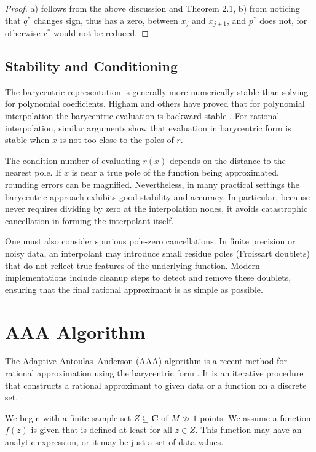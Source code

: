 \documentclass[11pt]{article}
\theoremstyle{definition}
\begin{document}
\begin{proof}
    a) follows from the above discussion and Theorem 2.1, b) from noticing that $q^{*}$ changes sign, thus has a zero, between $x_{j}$ and $x_{j+1}$, and $p^{*}$ does not, for otherwise $r^{*}$ would not be reduced.
\end{proof}

\subsection*{Stability and Conditioning}
The barycentric representation  is generally more numerically stable than solving for polynomial coefficients.  Higham and others have proved that for polynomial interpolation the barycentric evaluation is backward stable \cite{berrut2005barycentric}.  For rational interpolation, similar arguments show that evaluation in barycentric form is stable when $x$ is not too close to the poles of $r$.

The condition number of evaluating $r(x)$ depends on the distance to the nearest pole.  If $x$ is near a true pole of the function being approximated, rounding errors can be magnified.  Nevertheless, in many practical settings the barycentric approach exhibits good stability and accuracy.  In particular, because  never requires dividing by zero at the interpolation nodes, it avoids catastrophic cancellation in forming the interpolant itself.

One must also consider spurious pole-zero cancellations.  In finite precision or noisy data, an interpolant may introduce small residue poles (Froissart doublets) that do not reflect true features of the underlying function.  Modern implementations include cleanup steps to detect and remove these doublets, ensuring that the final rational approximant is as simple as possible.


\section{AAA Algorithm} 
The Adaptive Antoulas–Anderson (AAA) algorithm is a recent method for rational approximation
using the barycentric form \cite{AAAalg}. It is an iterative procedure that constructs a rational approximant to given
data or a function on a discrete set.

We begin with a finite sample set $Z \subseteq \mathbf{C}$ of $M \gg 1$ points. We assume a function $f(z)$ is given that is defined at least for all $z \in Z$. This function may have an analytic expression, or it may be just a set of data values.
\end{document}
